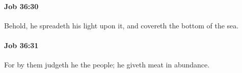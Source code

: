 		\paragraph{Job 36:30} %
			\label{JOB-36-30}

			Behold, he spreadeth his light upon it, and covereth the bottom of the sea.


		\paragraph{Job 36:31} %
			\label{JOB-36-31}

			For by them judgeth he the people; he giveth meat in abundance.


